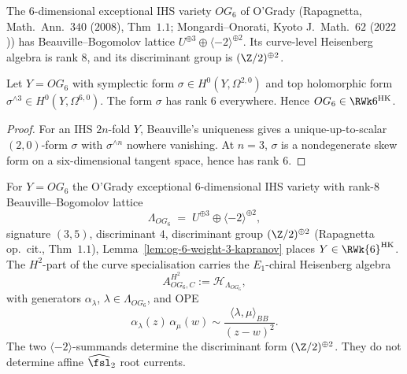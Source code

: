 The \(6\)-dimensional exceptional IHS variety \(OG_6\) of O'Grady
\textup{(}Rapagnetta, Math.\ Ann.~$340$
\textup{(}$2008$\textup{),} Thm~$1.1$; Mongardi--Onorati,
Kyoto J.\ Math.~$62$ \textup{(}$2022$\textup{)}\textup{)} has
Beauville--Bogomolov lattice
\(U^{\oplus3}\oplus\langle-2\rangle^{\oplus2}\). Its curve-level
Heisenberg algebra is rank \(8\), and its discriminant group is
\((\Z/2)^{\oplus2}\).

\begin{lemma}
\label{lem:og-6-weight-3-kapranov}
%
Let \(Y=OG_6\) with symplectic form \(\sigma\in H^0(Y,\Omega^{2,0})\) and
top holomorphic form \(\sigma^{\wedge3}\in H^0(Y,\Omega^{6,0})\). The form
\(\sigma\) has rank \(6\) everywhere. Hence
\(OG_6\in\RWk6^{\mathrm{HK}}\).
\end{lemma}

\begin{proof}
For an IHS \(2n\)-fold \(Y\), Beauville's uniqueness gives a
unique-up-to-scalar \((2,0)\)-form \(\sigma\) with \(\sigma^{\wedge n}\)
nowhere vanishing. At \(n=3\), \(\sigma\) is a nondegenerate skew form on a
six-dimensional tangent space, hence has rank \(6\).
\end{proof}

\begin{theorem}
\label{thm:phi-6-og-6}
%
%
For $Y = OG_6$ the O'Grady exceptional $6$-dimensional IHS variety
with rank-$8$ Beauville--Bogomolov lattice
\[
 \Lambda_{OG_6} \;=\; U^{\oplus 3} \oplus
 \langle -2 \rangle^{\oplus 2},
\]
signature $(3, 5)$, discriminant $4$, discriminant group
$(\Z/2)^{\oplus 2}$ \textup{(}Rapagnetta op.\ cit., Thm~$1.1$\textup{),}
Lemma~\ref{lem:og-6-weight-3-kapranov} places
\(Y \in \RWk{6}^{\mathrm{HK}}\). The \(H^2\)-part of the curve
specialisation carries the \(E_1\)-chiral Heisenberg algebra
\begin{equation}
\label{eq:phi-6-og-6-master}
 A^{H^2}_{OG_6,C}:=\mathcal H_{\Lambda_{OG_6}},
\end{equation}
with generators \(\alpha_\lambda\), \(\lambda\in\Lambda_{OG_6}\), and OPE
\[
 \alpha_\lambda(z)\,\alpha_\mu(w)\sim
 \frac{\langle\lambda,\mu\rangle_{BB}}{(z-w)^2}.
\]
The two \(\langle-2\rangle\)-summands determine the discriminant form
\((\Z/2)^{\oplus2}\). They do not determine affine \(\widehat{\fsl}_2\)
root currents.
\end{theorem}

